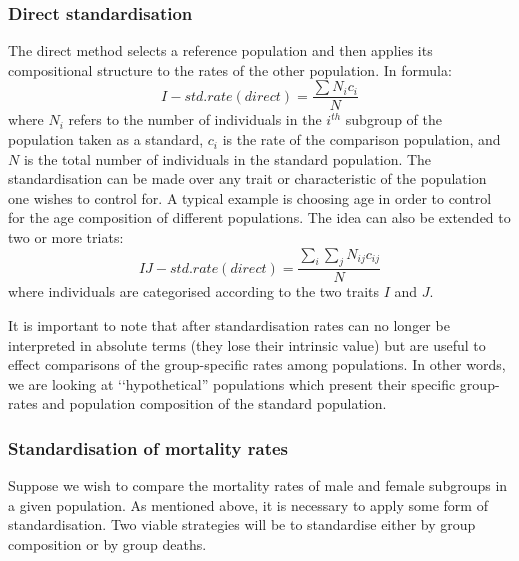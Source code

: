 \documentclass[\main/main.tex]{subfiles}
\begin{document}
\subsubsection{Direct standardisation}

The direct method selects a reference population and then applies its compositional structure to the rates of the other population. In formula:
\begin{equation}
    I- std. rate (direct) = \frac{\sum N_i c_i}{N}
\end{equation}
where $N_i$ refers to the number of individuals in the $i^{th}$ subgroup of the population taken as a standard, $c_i$ is the rate of the comparison population, and $N$ is the total number of individuals in the standard population.
The standardisation can be made over any trait or characteristic of the population one wishes to control for. A typical example is choosing age in order to control for the age composition of different populations. The idea can also be extended to two or more triats:
\begin{equation}
    IJ -  std. rate (direct) = \frac{\sum_{i}\sum_{j} N_{ij} c_{ij}}{N}
\end{equation}
where individuals are categorised according to the two traits $I$ and $J$.

It is important to note that after standardisation rates can no longer be interpreted in absolute terms (they lose their intrinsic value) but are useful to effect comparisons of the group-specific rates among  populations. In other words, we are looking at \lq\lq hypothetical'' populations which present their specific group-rates and population composition of the standard population. 


\subsubsection{Standardisation of mortality rates}

Suppose we wish to compare the mortality rates of male and female subgroups in a given population. As mentioned above, it is necessary to apply some form of standardisation. Two viable strategies will be to standardise either by group composition or by group deaths.
\end{document}
